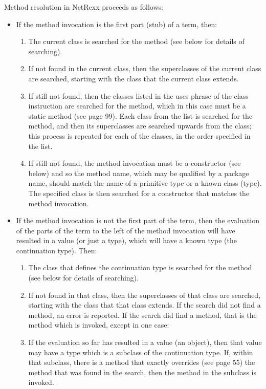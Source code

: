 Method resolution in NetRexx proceeds as follows:
\begin{itemize}
\item If the method invocation is the first part (stub) of a term, then:
  \begin{enumerate}
\item The current class is searched for the method (see below for details of searching).
\item If not found in the current class, then the superclasses of the current class are searched, starting with the class that the current class extends.
\item If still not found, then the classes listed in the uses phrase of the class instruction are searched for the method, which in this case must be a static method (see page 99). Each class from the list is searched for the method, and then its superclasses are searched upwards from the class; this process is repeated for each of the classes, in the order specified in the list.
\item If still not found, the method invocation must be a constructor (see below) and so the method name, which may be qualified by a package name, should match the name of a primitive type or a known class (type). The specified class is then searched for a constructor that matches the method invocation.
\end{enumerate}
\item If the method invocation is not the first part of the term, then the evaluation of the parts of the term to the left of the method invocation will have resulted in a value (or just a type), which will have a known type (the continuation type). Then:
  \begin{enumerate}
  \item The class that defines the continuation type is searched for the method (see below for details of searching).
\item If not found in that class, then the superclasses of that class are searched, starting with the class that that class extends.
If the search did not find a method, an error is reported.
If the search did find a method, that is the method which is invoked, except in one case:
\item If the evaluation so far has resulted in a value (an object), then that value may have a type which is a subclass of the continuation type. If, within that subclass, there is a method that exactly overrides (see page 55) the method that was found in the search, then the method in the subclass is invoked.
\end{enumerate}
\end{itemize}
